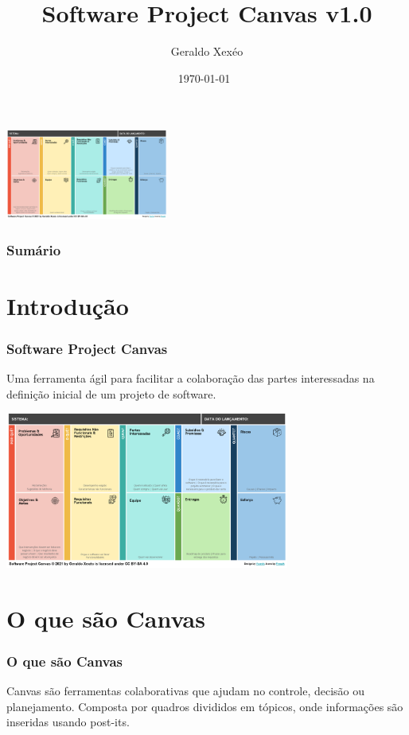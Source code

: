 \documentclass[aspectratio=169]{beamer}
\title{Software Project Canvas v1.0}
\author{Geraldo Xexéo}
\date{\today \ \DTMcurrenttime}
\begin{document}
\begin{frame}
\titlepage
\centering
\includegraphics[width=0.4\textwidth]{imagens/alternativa3.png}
\end{frame}

\begin{frame}
\frametitle{Sumário}
\tableofcontents
\end{frame}

\section{Introdução}

\begin{frame}
\frametitle{Software Project Canvas}
Uma ferramenta ágil para facilitar a colaboração das partes interessadas na definição inicial de um projeto de software.

\centering
\includegraphics[width=0.7\textwidth]{imagens/alternativa1.png}
\end{frame}


\section{O que são Canvas}

\begin{frame}
\frametitle{O que são Canvas}
Canvas são ferramentas colaborativas que ajudam no controle, decisão ou planejamento. Composta por quadros divididos em tópicos, onde informações são inseridas usando post-its.
\end{frame}
\end{document}
